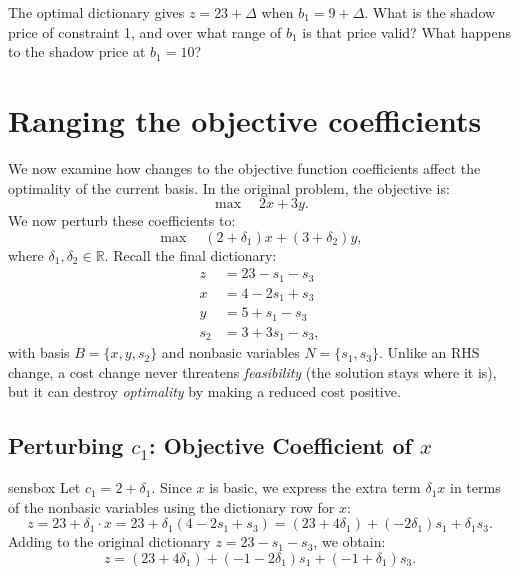 \begin{learningcheckpoint}[label={lc:shadow-price-b1}]
The optimal dictionary gives \( z = 23 + \Delta \) when \( b_1 = 9 + \Delta \). What is the shadow price of constraint 1, and over what range of \( b_1 \) is that price valid? What happens to the shadow price at \( b_1 = 10 \)?
\end{learningcheckpoint}

\section{Ranging the objective coefficients}
\label{sec:sensitivity-cost}

We now examine how changes to the objective function coefficients affect the optimality of the current basis. In the original problem, the objective is:
\[
\max \quad 2x + 3y.
\]
We now perturb these coefficients to:
\[
\max \quad (2 + \delta_1)x + (3 + \delta_2)y,
\]
where \( \delta_1, \delta_2 \in \mathbb{R} \). Recall the final dictionary:
\[
\begin{aligned}
z &= 23 - s_1 - s_3 \\
x &= 4 - 2s_1 + s_3 \\
y &= 5 + s_1 - s_3 \\
s_2 &= 3 + 3s_1 - s_3,
\end{aligned}
\]
with basis \( B = \{x, y, s_2\} \) and nonbasic variables \( N = \{s_1, s_3\} \). Unlike an RHS change, a cost change never threatens \emph{feasibility} (the solution stays where it is), but it can destroy \emph{optimality} by making a reduced cost positive.

\subsection{Perturbing \( c_1 \): Objective Coefficient of \( x \)}

\begin{steppanel}{sensbox}
Let \( c_1 = 2 + \delta_1 \). Since \( x \) is basic, we express the extra term \( \delta_1 x \) in terms of the nonbasic variables using the dictionary row for \( x \):
\[
z = 23 + \delta_1 \cdot x = 23 + \delta_1(4 - 2s_1 + s_3)
= (23 + 4\delta_1) + (-2\delta_1)s_1 + \delta_1 s_3.
\]
Adding to the original dictionary \( z = 23 - s_1 - s_3 \), we obtain:
\[
z = (23 + 4\delta_1) + (-1 - 2\delta_1)s_1 + (-1 + \delta_1)s_3.
\]
\end{steppanel}

